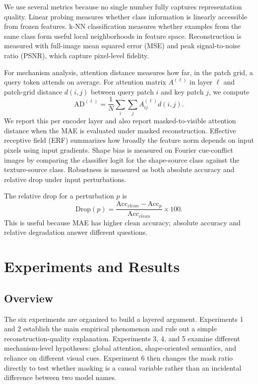 \documentclass[10pt,twocolumn,letterpaper]{article}
\begin{document}
We use several metrics because no single number fully captures representation quality. Linear probing measures whether class information is linearly accessible from frozen features. k-NN classification measures whether examples from the same class form useful local neighborhoods in feature space. Reconstruction is measured with full-image mean squared error (MSE) and peak signal-to-noise ratio (PSNR), which capture pixel-level fidelity.

For mechanism analysis, attention distance measures how far, in the patch grid, a query token attends on average. For attention matrix $A^{(\ell)}$ in layer $\ell$ and patch-grid distance $d(i,j)$ between query patch $i$ and key patch $j$, we compute
\begin{equation}
    \mathrm{AD}^{(\ell)} =
    \frac{1}{N}
    \sum_i \sum_j A^{(\ell)}_{ij} d(i,j).
\end{equation}
We report this per encoder layer and also report masked-to-visible attention distance when the MAE is evaluated under masked reconstruction. Effective receptive field (ERF) summarizes how broadly the feature norm depends on input pixels using input gradients. Shape bias is measured on Fourier cue-conflict images by comparing the classifier logit for the shape-source class against the texture-source class. Robustness is measured as both absolute accuracy and relative drop under input perturbations.

The relative drop for a perturbation $p$ is
\begin{equation}
    \mathrm{Drop}(p) =
    \frac{\mathrm{Acc}_{clean} - \mathrm{Acc}_{p}}
    {\mathrm{Acc}_{clean}} \times 100 .
\end{equation}
This is useful because MAE has higher clean accuracy; absolute accuracy and relative degradation answer different questions.

\section{Experiments and Results}

\subsection{Overview}

The six experiments are organized to build a layered argument. Experiments 1 and 2 establish the main empirical phenomenon and rule out a simple reconstruction-quality explanation. Experiments 3, 4, and 5 examine different mechanism-level hypotheses: global attention, shape-oriented semantics, and reliance on different visual cues. Experiment 6 then changes the mask ratio directly to test whether masking is a causal variable rather than an incidental difference between two model names.
\end{document}
